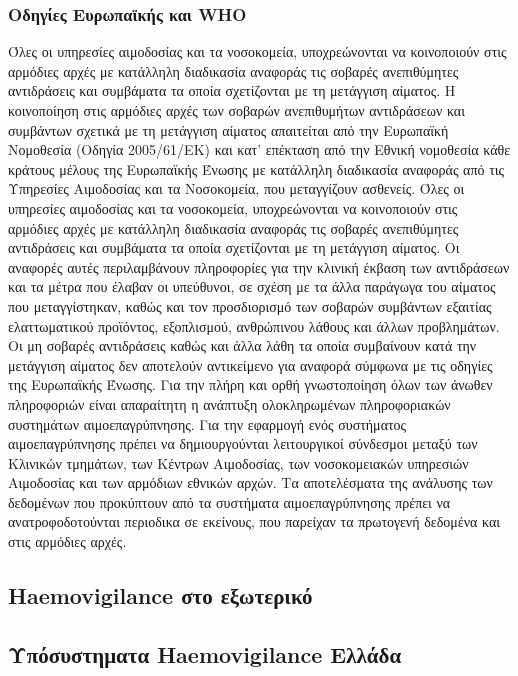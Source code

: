 		\subsubsection{Οδηγίες Ευρωπαϊκής και WHO}
		Όλες οι υπηρεσίες αιμοδοσίας και τα νοσοκομεία, υποχρεώνονται να κοινοποιούν στις αρμόδιες αρχές με κατάλληλη διαδικασία αναφοράς τις σοβαρές ανεπιθύμητες αντιδράσεις 	και συμβάματα τα οποία σχετίζονται με τη μετάγγιση αίματος. Η κοινοποίηση στις αρμόδιες αρχές των σοβαρών ανεπιθυμήτων αντιδράσεων και συμβάντων σχετικά με τη μετάγγιση αίματος απαιτείται από την Ευρωπαϊκή Νομοθεσία (Οδηγία 2005/61/ΕΚ) και κατ’ επέκταση από την Εθνική νομοθεσία κάθε κράτους μέλους της Ευρωπαϊκής Ένωσης με κατάλληλη διαδικασία αναφοράς από τις Υπηρεσίες Αιμοδοσίας και τα Νοσοκομεία, που μεταγγίζουν ασθενείς.  
		Όλες οι υπηρεσίες αιμοδοσίας και τα νοσοκομεία, υποχρεώνονται να κοινοποιούν στις αρμόδιες αρχές με κατάλληλη διαδικασία αναφοράς τις σοβαρές ανεπιθύμητες αντιδράσεις και συμβάματα τα οποία σχετίζονται με τη μετάγγιση αίματος. Οι αναφορές αυτές περιλαμβάνουν πληροφορίες για την κλινική έκβαση των αντιδράσεων και τα μέτρα που έλαβαν οι υπεύθυνοι, σε σχέση με τα άλλα παράγωγα του αίματος που μεταγγίστηκαν, καθώς και τον προσδιορισμό των σοβαρών συμβάντων εξαιτίας ελαττωματικού προϊόντος, εξοπλισμού, ανθρώπινου λάθους και άλλων προβλημάτων.\cite{cite-revekka} Οι μη σοβαρές αντιδράσεις καθώς και άλλα λάθη τα οποία συμβαίνουν κατά την μετάγγιση αίματος δεν αποτελούν αντικείμενο για αναφορά σύμφωνα με τις οδηγίες της Ευρωπαϊκής Ένωσης.
		Για την πλήρη και ορθή γνωστοποίηση όλων των άνωθεν πληροφοριών είναι απαραίτητη η ανάπτυξη ολοκληρωμένων πληροφοριακών συστημάτων αιμοεπαγρύπνησης. Για την εφαρμογή ενός συστήματος αιμοεπαγρύπνησης πρέπει να δημιουργούνται λειτουργικοί σύνδεσμοι μεταξύ των Κλινικών τμημάτων, των Κέντρων Αιμοδοσίας, των νοσοκομειακών υπηρεσιών Αιμοδοσίας και των αρμόδιων εθνικών αρχών. Τα αποτελέσματα της ανάλυσης των δεδομένων που προκύπτουν από τα συστήματα αιμοεπαγρύπνησης πρέπει να ανατροφοδοτούνται περιοδικα σε εκείνους, που παρείχαν τα πρωτογενή δεδομένα και στις αρμόδιες αρχές.
		

	\subsection{Haemovigilance στο εξωτερικό}
	\subsection{Υπόσυστηματα Haemovigilance Ελλάδα}
